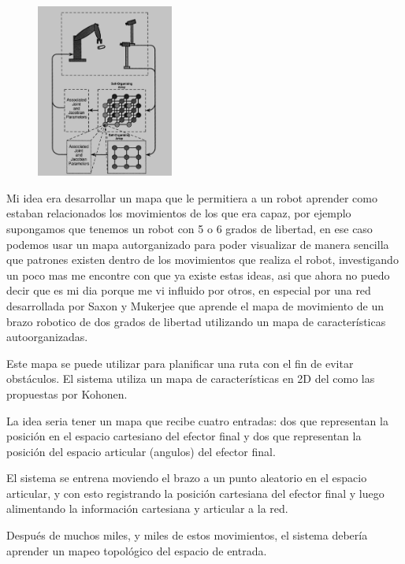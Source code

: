 \documentclass[fleqn, journal, onecolumn]{IEEEtran}             %
\theoremstyle{break}                                            %
\begin{document}
      \begin{figure}
        \centering
        \includegraphics[width=0.4\textwidth]{Table5}
        \caption{ \cite{Robot}}
      \end{figure}


      Mi idea era desarrollar un mapa que le permitiera a un robot aprender como
      estaban relacionados los movimientos de los que era capaz, por ejemplo
      supongamos que tenemos un robot con 5 o 6 grados de libertad, en ese caso
      podemos usar un mapa autorganizado para poder visualizar de manera sencilla
      que patrones existen dentro de los movimientos que realiza el robot, investigando un poco
      mas me encontre con que ya existe estas ideas, asi que ahora no puedo decir que es mi dia porque
      me vi influido por otros, en especial por una
      red desarrollada por Saxon y Mukerjee que aprende el mapa de movimiento de un 
      brazo robotico de dos grados de libertad utilizando un mapa de características 
      autoorganizadas. 
      
      Este mapa se puede utilizar para planificar una ruta con el fin de evitar obstáculos.
      El sistema utiliza un mapa de características en 2D del como las  propuestas por Kohonen.

      La idea seria tener un mapa que recibe cuatro entradas: dos que representan la posición en el espacio cartesiano
      del efector final y dos que representan la posición del espacio articular (angulos) del efector final.

      El sistema se entrena moviendo el brazo a un punto aleatorio en el espacio articular, y
      con esto registrando la posición cartesiana del efector final y luego alimentando la información 
      cartesiana y articular a la red.
      
      Después de muchos miles, y miles de estos movimientos, el sistema debería
      aprender un mapeo topológico del espacio de entrada. 
      
\end{document}
